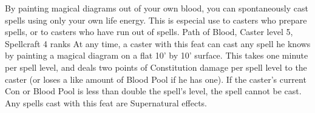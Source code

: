 \shortdescfeat
{By painting magical diagrams out of your own blood, you can spontaneously cast spells using only your own life energy. This is especial use to casters who prepare spells, or to casters who have run out of spells.}
{Path of Blood, Caster level 5, Spellcraft 4 ranks}
{At any time, a caster with this feat can cast any spell he knows by painting a magical diagram on a flat 10' by 10' surface. This takes one minute per spell level, and deals two points of Constitution damage per spell level to the caster (or loses a like amount of Blood Pool if he has one). If the caster's current Con or Blood Pool is less than double the spell's level, the spell cannot be cast.\\
Any spells cast with this feat are Supernatural effects.}

